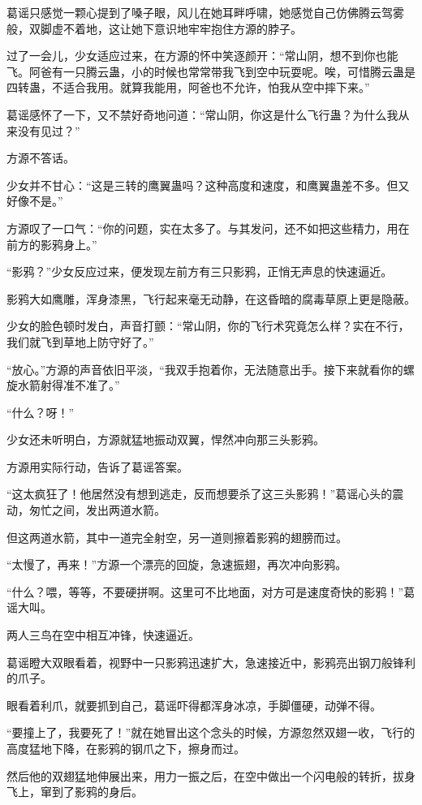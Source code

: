 \begin{this_body}
葛谣只感觉一颗心提到了嗓子眼，风儿在她耳畔呼啸，她感觉自己仿佛腾云驾雾般，双脚虚不着地，这让她下意识地牢牢抱住方源的脖子。

过了一会儿，少女适应过来，在方源的怀中笑逐颜开：“常山阴，想不到你也能飞。阿爸有一只腾云蛊，小的时候也常常带我飞到空中玩耍呢。唉，可惜腾云蛊是四转蛊，不适合我用。就算我能用，阿爸也不允许，怕我从空中摔下来。”

葛谣感怀了一下，又不禁好奇地问道：“常山阴，你这是什么飞行蛊？为什么我从来没有见过？”

方源不答话。

少女并不甘心：“这是三转的鹰翼蛊吗？这种高度和速度，和鹰翼蛊差不多。但又好像不是。”

方源叹了一口气：“你的问题，实在太多了。与其发问，还不如把这些精力，用在前方的影鸦身上。”

“影鸦？”少女反应过来，便发现左前方有三只影鸦，正悄无声息的快速逼近。

影鸦大如鹰雕，浑身漆黑，飞行起来毫无动静，在这昏暗的腐毒草原上更是隐蔽。

少女的脸色顿时发白，声音打颤：“常山阴，你的飞行术究竟怎么样？实在不行，我们就飞到草地上防守好了。”

“放心。”方源的声音依旧平淡，“我双手抱着你，无法随意出手。接下来就看你的螺旋水箭射得准不准了。”

“什么？呀！”

少女还未听明白，方源就猛地振动双翼，悍然冲向那三头影鸦。

方源用实际行动，告诉了葛谣答案。

“这太疯狂了！他居然没有想到逃走，反而想要杀了这三头影鸦！”葛谣心头的震动，匆忙之间，发出两道水箭。

但这两道水箭，其中一道完全射空，另一道则擦着影鸦的翅膀而过。

“太慢了，再来！”方源一个漂亮的回旋，急速振翅，再次冲向影鸦。

“什么？喂，等等，不要硬拼啊。这里可不比地面，对方可是速度奇快的影鸦！”葛谣大叫。

两人三鸟在空中相互冲锋，快速逼近。

葛谣瞪大双眼看着，视野中一只影鸦迅速扩大，急速接近中，影鸦亮出钢刀般锋利的爪子。

眼看着利爪，就要抓到自己，葛谣吓得都浑身冰凉，手脚僵硬，动弹不得。

“要撞上了，我要死了！”就在她冒出这个念头的时候，方源忽然双翅一收，飞行的高度猛地下降，在影鸦的钢爪之下，擦身而过。

然后他的双翅猛地伸展出来，用力一振之后，在空中做出一个闪电般的转折，拔身飞上，窜到了影鸦的身后。


\end{this_body}
